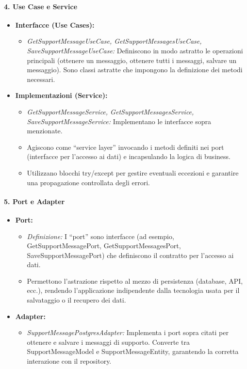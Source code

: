     \paragraph{4. Use Case e Service}
    \begin{itemize}
        \item \textbf{Interfacce (Use Cases):}
        \begin{itemize}
            \item \textit{GetSupportMessageUseCase, GetSupportMessagesUseCase, SaveSupportMessageUseCase:} Definiscono in modo astratto le operazioni principali (ottenere un messaggio, ottenere tutti i messaggi, salvare un messaggio). Sono classi astratte che impongono la definizione dei metodi necessari.
        \end{itemize}
        \item \textbf{Implementazioni (Service):}
        \begin{itemize}
            \item \textit{GetSupportMessageService, GetSupportMessagesService, SaveSupportMessageService:} Implementano le interfacce sopra menzionate.
            \item Agiscono come “service layer” invocando i metodi definiti nei port (interfacce per l’accesso ai dati) e incapsulando la logica di business.
            \item Utilizzano blocchi try/except per gestire eventuali eccezioni e garantire una propagazione controllata degli errori.
        \end{itemize}
    \end{itemize}

    \paragraph{5. Port e Adapter}
    \begin{itemize}
        \item \textbf{Port:}
        \begin{itemize}
            \item \textit{Definizione:} I “port” sono interfacce (ad esempio, GetSupportMessagePort, GetSupportMessagesPort, SaveSupportMessagePort) che definiscono il contratto per l’accesso ai dati.
            \item Permettono l’astrazione rispetto al mezzo di persistenza (database, API, ecc.), rendendo l’applicazione indipendente dalla tecnologia usata per il salvataggio o il recupero dei dati.
        \end{itemize}
        \item \textbf{Adapter:}
        \begin{itemize}
            \item \textit{SupportMessagePostgresAdapter:} Implementa i port sopra citati per ottenere e salvare i messaggi di supporto. Converte tra SupportMessageModel e SupportMessageEntity, garantendo la corretta interazione con il repository.
        \end{itemize}
    \end{itemize}

